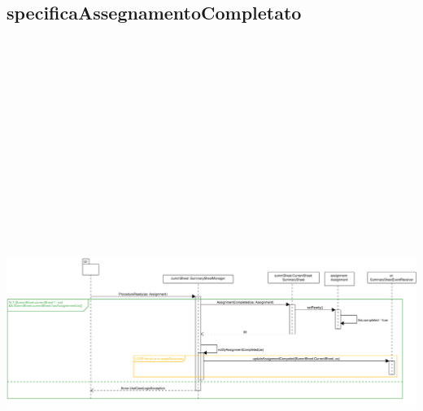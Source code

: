 \subsection{specificaAssegnamentoCompletato}
\centering\includegraphics[max width=\textwidth, max height=190mm]{../resources/img/GCC/DSD/op5a.png}

